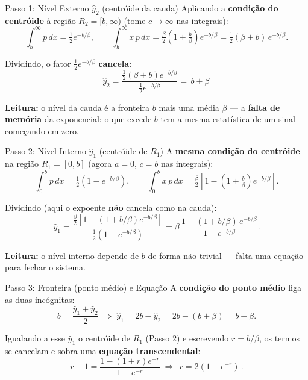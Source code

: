 \begin{frame}{Passo 1: Nível Externo $\hat y_2$ (centróide da cauda)}
  Aplicando a \textbf{condição do centróide} à região $R_2=[b,\infty)$
  (tome $c\to\infty$ nas integrais):
  \[
    \int_b^\infty p\,dx = \tfrac{1}{2}e^{-b/\beta},
    \qquad
    \int_b^\infty x\,p\,dx = \tfrac{\beta}{2}\left(1+\tfrac{b}{\beta}\right)e^{-b/\beta}
                           = \tfrac{1}{2}(\beta+b)\,e^{-b/\beta}.
  \]

  \vspace{0.1cm}
  Dividindo, o fator $\tfrac{1}{2}e^{-b/\beta}$ \textbf{cancela}:
  \[
    \hat y_2 = \frac{\tfrac{1}{2}(\beta+b)e^{-b/\beta}}{\tfrac{1}{2}e^{-b/\beta}}
             = \boxed{\,b + \beta\,}
  \]

  \vspace{0.15cm}
  {\footnotesize \textbf{Leitura:} o nível da cauda é a fronteira $b$ mais
  uma média $\beta$ — a \textbf{falta de memória} da exponencial: o que
  excede $b$ tem a mesma estatística de um sinal começando em zero.}
\end{frame}


\begin{frame}{Passo 2: Nível Interno $\hat y_1$ (centróide de $R_1$)}
  A \textbf{mesma condição do centróide} na região $R_1=[0,b]$
  (agora $a=0$, $c=b$ nas integrais):
  \[
    \int_0^b p\,dx = \tfrac{1}{2}\left(1-e^{-b/\beta}\right),
    \qquad
    \int_0^b x\,p\,dx = \tfrac{\beta}{2}\left[1-\left(1+\tfrac{b}{\beta}\right)e^{-b/\beta}\right].
  \]

  \vspace{0.1cm}
  Dividindo (aqui o expoente \textbf{não} cancela como na cauda):
  \[
    \hat y_1 = \frac{\tfrac{\beta}{2}\left[1-(1+b/\beta)e^{-b/\beta}\right]}
                    {\tfrac{1}{2}\left(1-e^{-b/\beta}\right)}
             = \beta\,\frac{1-(1+b/\beta)\,e^{-b/\beta}}{1-e^{-b/\beta}}.
  \]

  \vspace{0.15cm}
  {\footnotesize \textbf{Leitura:} o nível interno depende de $b$ de forma
  não trivial — falta uma equação para fechar o sistema.}
\end{frame}


\begin{frame}{Passo 3: Fronteira (ponto médio) e Equação}
  A \textbf{condição do ponto médio} liga as duas incógnitas:
  \[
    b = \frac{\hat y_1 + \hat y_2}{2}
    \;\Longrightarrow\;
    \hat y_1 = 2b - \hat y_2 = 2b - (b+\beta) = b - \beta.
  \]

  \vspace{0.1cm}
  Igualando a esse $\hat y_1$ o centróide de $R_1$ (Passo 2) e escrevendo
  $r = b/\beta$, os termos se cancelam e sobra uma \textbf{equação
  transcendental}:
  \[
    r - 1 = \frac{1-(1+r)e^{-r}}{1-e^{-r}}
    \;\Longrightarrow\;
    \boxed{\,r = 2\left(1 - e^{-r}\right)\,}.
  \]
\end{frame}

